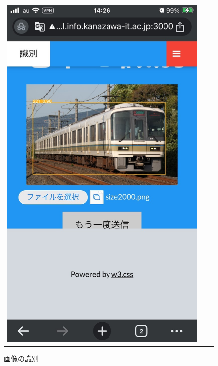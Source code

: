 \begin{figure}[H]
\begin{tabular}{ccc}
\begin{minipage}[b]{0.3\textwidth}
			\includegraphics[width=\linewidth]{chap2/fig/img_identify.jpg}
			\caption{画像の識別}
			\label{img_det}
		\end{minipage}
		\begin{minipage}[b]{0.3\textwidth}
			\centering

\end{minipage}
\end{tabular}
\end{figure}
